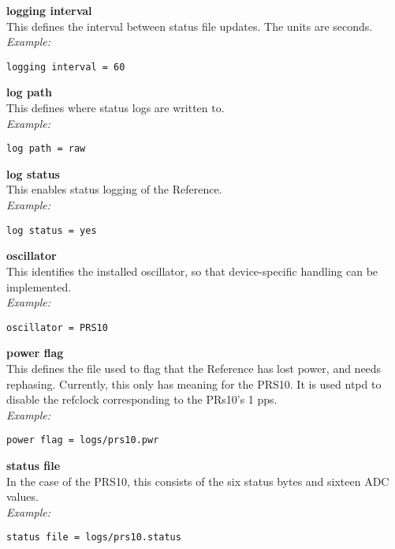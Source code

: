 {\bfseries logging interval}\\ \hypertarget{h:reference_logging_interval}{}
This defines the interval between status file updates. The units are seconds.\\
\textit{Example:}
\begin{lstlisting}
logging interval = 60
\end{lstlisting}

{\bfseries log path}\\ \hypertarget{h:reference_log_path}{}
This defines where status logs are written to.\\
\textit{Example:}
\begin{lstlisting}
log path = raw
\end{lstlisting}

{\bfseries log status}\\ \hypertarget{h:reference_log_status}{}
This enables status logging of the Reference.\\
\textit{Example:}
\begin{lstlisting}
log status = yes
\end{lstlisting}

{\bfseries oscillator}\\
This identifies the installed oscillator, so that device-specific handling can be implemented.\\
\textit{Example:}
\begin{lstlisting}
oscillator = PRS10
\end{lstlisting}

{\bfseries power flag}\\ \hypertarget{h:reference_power_flag}{}
This defines the file used to flag that the Reference has lost power, and needs rephasing.
Currently, this only has meaning for the PRS10. It is used ntpd to disable the refclock
corresponding to the PRs10's 1 pps.\\
\textit{Example:}
\begin{lstlisting}
power flag = logs/prs10.pwr
\end{lstlisting}

{\bfseries status file}\\ \hypertarget{h:reference_status_file}{}
In the case of the PRS10, this consists of the six status bytes and sixteen ADC values.\\
\textit{Example:}
\begin{lstlisting}
status file = logs/prs10.status
\end{lstlisting}


